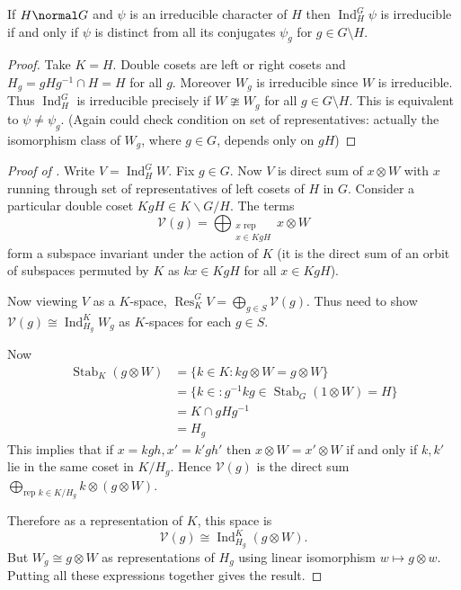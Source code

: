 \documentclass[a4paper]{article}
\DeclareMathOperator{\Res}{Res} %
\DeclareMathOperator{\Ind}{Ind} %
\theoremstyle{definition}
\begin{document}
\begin{corollary}
  If \(H \normal G\) and \(\psi\) is an irreducible character of \(H\) then \(\Ind_H^G \psi\) is irreducible if and only if \(\psi\) is distinct from all its conjugates \(\psi_g\) for \(g \in G \setminus H\).
\end{corollary}

\begin{proof}
  Take \(K = H\). Double cosets are left or right cosets and \(H_g = gHg^{-1} \cap H = H\) for all \(g\). Moreover \(W_g\) is irreducible since \(W\) is irreducible. Thus \(\Ind_H^G\) is irreducible precisely if \(W \ncong W_g\) for all \(g \in G \setminus H\). This is equivalent to \(\psi \neq \psi_g\). (Again could check condition on set of representatives: actually the isomorphism class of \(W_g\), where \(g \in G\), depends only on \(gH\))
\end{proof}

\begin{proof}[Proof of ]
  Write \(V = \Ind_H^G W\). Fix \(g \in G\). Now \(V\) is direct sum of \(x \otimes W\) with \(x\) running through set of representatives of left cosets of \(H\) in \(G\). Consider a particular double coset \(KgH \in K \backslash G/H\). The terms
  \[
    \mathcal V(g) = \bigoplus_{\substack{x \text{ rep} \\ x \in KgH}} x \otimes W
  \]
  form a subspace invariant under the action of \(K\) (it is the direct sum of an orbit of subspaces permuted by \(K\) as \(kx \in KgH\) for all \(x \in KgH\)).

  Now viewing \(V\) as a \(K\)-space, \(\Res_K^G V = \bigoplus_{g \in S} \mathcal V(g)\). Thus need to show \(\mathcal V(g) \cong \Ind_{H_g}^K W_g\) as \(K\)-spaces for each \(g \in S\).

  Now
  \begin{align*}
    \operatorname{Stab}_K (g \otimes W)
    &= \{k \in K: kg \otimes W = g \otimes W\} \\
    &= \{k \in : g^{-1}kg \in \operatorname{Stab}_G(1 \otimes W) = H\} \\
    &= K \cap gHg^{-1} \\
    &= H_g
  \end{align*}
  This implies that if \(x = kgh, x' = k'gh'\) then \(x \otimes W = x' \otimes W\) if and only if \(k, k'\) lie in the same coset in \(K/H_g\). Hence \(\mathcal V(g)\) is the direct sum \(\bigoplus_{\text{rep } k \in K/H_g} k \otimes (g \otimes W)\).

  Therefore as a representation of \(K\), this space is
  \[
    \mathcal V(g) \cong \Ind_{H_g}^K (g \otimes W).
  \]
  But \(W_g \cong g \otimes W\) as representations of \(H_g\) using linear isomorphism \(w \mapsto g \otimes w\). Putting all these expressions together gives the result.
\end{proof}
\end{document}
